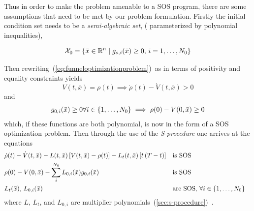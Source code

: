 Thus in order to make the problem amenable to a \ac{SOS} program, there are some
assumptions that need to be met by our problem formulation. Firstly the initial
condition set needs to be a \textit{semi-algebraic set}, (\ie{} parameterized by
polynomial inequalities),

\begin{equation}
  \mathcal{X}_0 = \lbrace\bar{x} \in \mathbb{R}^n \mid g_{o,i}(\bar{x}) \geq 0, \, i = 1,\ldots,N_0\rbrace
\end{equation}

Then rewriting~(\ref{eq:funneloptimizationproblem})~as in terms of positivity
and equality constraints yields
\begin{equation}
  V(t,\bar{x}) = \rho(t) \implies \dot{\rho}(t) - \dot{V}(t,\bar{x}) > 0
\end{equation}
and
\begin{equation}
  g_{0,i}(\bar{x}) \geq 0 \forall i \in \lbrace1,\ldots,N_0\rbrace \implies \rho(0) - V(0,\bar{x}) \geq 0
\end{equation}
which, if these functions are both polynomial, is now in the form of a \ac{SOS}
optimization problem. Then through the use of the \textit{S-procedure} one
arrives at the equations
\begin{align}
  &\dot{\rho}(t) - \dot{V}(t,\bar{x}) - L(t,\bar{x})\left[ V(t,\bar{x}) - \rho(t) \right] - L_{t}(t,\bar{x})\left[ t\left( T - t \right) \right]  && \text{is SOS}& \label{eq:sufficient-conditions}\\
  & \rho(0) - V(0,\bar{x}) - \sum_{i}^{N_{0}} L_{0,i}(\bar{x})g_{0,i}(\bar{x}) && \text{is SOS}& \\
  & L_{t}(\bar{x}), \, L_{0,i}(\bar{x}) \; &&\text{are SOS}, \, \forall i \in \lbrace1,\ldots,N_{0}\rbrace \label{eq:sufficient-conditions3} \\
\end{align} 
where \(L\), \(L_{t}\), and \(L_{0,i}\) are multiplier
polynomials~(\ref{sec:s-procedure})~.

